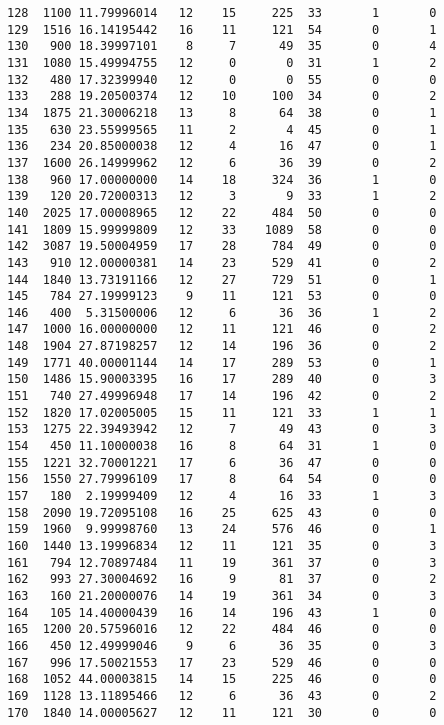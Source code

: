 \documentclass[
  letterpaper,
  DIV=11,
  numbers=noendperiod]{scrreprt}
\begin{document}
\begin{verbatim}
128  1100 11.79996014   12    15     225  33       1       0
129  1516 16.14195442   16    11     121  54       0       1
130   900 18.39997101    8     7      49  35       0       4
131  1080 15.49994755   12     0       0  31       1       2
132   480 17.32399940   12     0       0  55       0       0
133   288 19.20500374   12    10     100  34       0       2
134  1875 21.30006218   13     8      64  38       0       1
135   630 23.55999565   11     2       4  45       0       1
136   234 20.85000038   12     4      16  47       0       1
137  1600 26.14999962   12     6      36  39       0       2
138   960 17.00000000   14    18     324  36       1       0
139   120 20.72000313   12     3       9  33       1       2
140  2025 17.00008965   12    22     484  50       0       0
141  1809 15.99999809   12    33    1089  58       0       0
142  3087 19.50004959   17    28     784  49       0       0
143   910 12.00000381   14    23     529  41       0       2
144  1840 13.73191166   12    27     729  51       0       1
145   784 27.19999123    9    11     121  53       0       0
146   400  5.31500006   12     6      36  36       1       2
147  1000 16.00000000   12    11     121  46       0       2
148  1904 27.87198257   12    14     196  36       0       2
149  1771 40.00001144   14    17     289  53       0       1
150  1486 15.90003395   16    17     289  40       0       3
151   740 27.49996948   17    14     196  42       0       2
152  1820 17.02005005   15    11     121  33       1       1
153  1275 22.39493942   12     7      49  43       0       3
154   450 11.10000038   16     8      64  31       1       0
155  1221 32.70001221   17     6      36  47       0       0
156  1550 27.79996109   17     8      64  54       0       0
157   180  2.19999409   12     4      16  33       1       3
158  2090 19.72095108   16    25     625  43       0       0
159  1960  9.99998760   13    24     576  46       0       1
160  1440 13.19996834   12    11     121  35       0       3
161   794 12.70897484   11    19     361  37       0       3
162   993 27.30004692   16     9      81  37       0       2
163   160 21.20000076   14    19     361  34       0       3
164   105 14.40000439   16    14     196  43       1       0
165  1200 20.57596016   12    22     484  46       0       0
166   450 12.49999046    9     6      36  35       0       3
167   996 17.50021553   17    23     529  46       0       0
168  1052 44.00003815   14    15     225  46       0       0
169  1128 13.11895466   12     6      36  43       0       2
170  1840 14.00005627   12    11     121  30       0       0

\end{verbatim}
\end{document}
